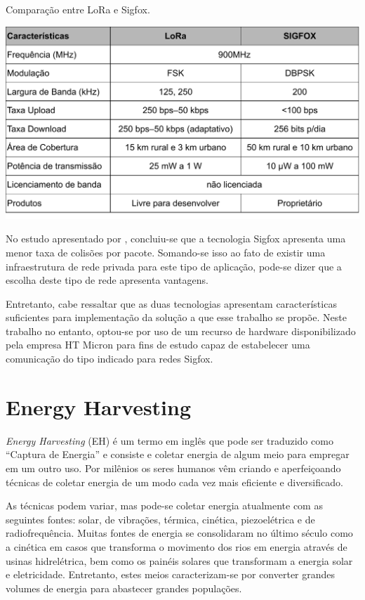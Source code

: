 \begin{quadro}
\caption{Comparação entre LoRa e Sigfox.}
\label{qd:LoraVsSigfox}
  \begin{center}
      \includegraphics[scale=0.76]{img/LoraVsSigfox.pdf}
  \end{center}
\end{quadro}

No estudo apresentado por , concluiu-se que a tecnologia Sigfox apresenta uma menor taxa de colisões por pacote. Somando-se isso ao fato de existir uma infraestrutura de rede privada para este tipo de aplicação, pode-se dizer que a escolha deste tipo de rede apresenta vantagens.

Entretanto, cabe ressaltar que as duas tecnologias apresentam características suficientes para implementação da solução a que esse trabalho se propõe. Neste trabalho no entanto, optou-se por uso de um recurso de hardware disponibilizado pela empresa HT Micron para fins de estudo capaz de estabelecer uma comunicação do tipo indicado para redes Sigfox.
\section{Energy Harvesting}
\textit{Energy Harvesting} (EH) é um termo em inglês que pode ser traduzido como ``Captura de Energia'' e consiste e coletar energia de algum meio para empregar em um outro uso. Por milênios os seres humanos vêm criando e aperfeiçoando técnicas de coletar energia de um modo cada vez mais eficiente e diversificado.

As técnicas podem variar, mas pode-se coletar energia atualmente com as seguintes fontes: solar, de vibrações, térmica, cinética, piezoelétrica e de radiofrequência. Muitas fontes de energia se consolidaram no último século como a cinética em casos que transforma o movimento dos rios em energia através de usinas hidrelétrica, bem como os painéis solares que transformam a energia solar e eletricidade. Entretanto, estes meios caracterizam-se por converter grandes volumes de energia para abastecer grandes populações. 

